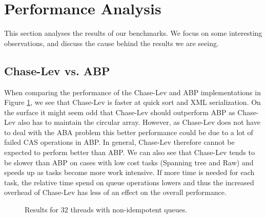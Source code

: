 \section{Performance Analysis}
This section analyses the results of our benchmarks. We focus on some interesting observations, and discuss the cause behind the results we are seeing.
\label{sec:performance_analysis}
\subsection{Chase-Lev vs. ABP}
When comparing the performance of the Chase-Lev and ABP implementations in Figure \ref{fig:32nonidem}, we see that Chase-Lev is faster at quick sort and XML serialization. On the surface it might seem odd that Chase-Lev should outperform ABP as Chase-Lev also has to maintain the circular array. However, as Chase-Lev does not have to deal with the ABA problem this better performance could be due to a lot of failed CAS operations in ABP\@. In general, Chase-Lev therefore cannot be expected to perform better than ABP\@. We can also see that Chase-Lev tends to be slower than ABP on cases with low cost tasks (Spanning tree and Raw) and speeds up as tasks become more work intensive. If more time is needed for each task, the relative time spend on queue operations lowers and thus the increased overhead of Chase-Lev has less of an effect on the overall performance.

\begin{figure}
\caption{Results for 32 threads with non-idempotent queues.}
\label{fig:32nonidem}
\end{figure}

